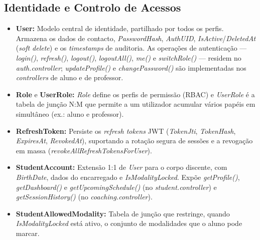 \documentclass[12pt,a4paper]{report}
\begin{document}
\subsection{Identidade e Controlo de Acessos}
\begin{itemize}
    \item \textbf{User:} Modelo central de identidade, partilhado por todos os
    perfis. Armazena os dados de contacto, \textit{PasswordHash}, \textit{AuthUID},
    \textit{IsActive}/\textit{DeletedAt} (\textit{soft delete}) e os
    \textit{timestamps} de auditoria. As operações de autenticação ---
    \textit{login()}, \textit{refresh()}, \textit{logout()}, \textit{logoutAll()},
    \textit{me()} e \textit{switchRole()} --- residem no \textit{auth.controller};
    \textit{updateProfile()} e \textit{changePassword()} são implementadas nos
    \textit{controllers} de aluno e de professor.

    \item \textbf{Role} e \textbf{UserRole:} \textit{Role} define os perfis de
    permissão (RBAC) e \textit{UserRole} é a tabela de junção N:M que permite a um
    utilizador acumular vários papéis em simultâneo (ex.: aluno e professor).

    \item \textbf{RefreshToken:} Persiste os \textit{refresh tokens} JWT
    (\textit{TokenJti}, \textit{TokenHash}, \textit{ExpiresAt}, \textit{RevokedAt}),
    suportando a rotação segura de sessões e a revogação em massa
    (\textit{revokeAllRefreshTokensForUser}).

    \item \textbf{StudentAccount:} Extensão 1:1 de \textit{User} para o corpo
    discente, com \textit{BirthDate}, dados do encarregado e \textit{IsModalityLocked}.
    Expõe \textit{getProfile()}, \textit{getDashboard()} e
    \textit{getUpcomingSchedule()} (no \textit{student.controller}) e
    \textit{getSessionHistory()} (no \textit{coaching.controller}).

    \item \textbf{StudentAllowedModality:} Tabela de junção que restringe, quando
    \textit{IsModalityLocked} está ativo, o conjunto de modalidades que o aluno
    pode marcar.
\end{itemize}
\end{document}
